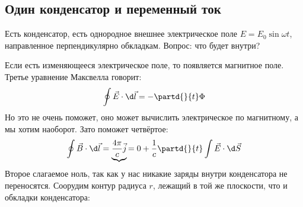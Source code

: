 \subsection{Один конденсатор и переменный ток}
	Есть конденсатор, есть однородное внешнее электрическое поле $E=E_0 \sin \omega t$, направленное перпендикулярно обкладкам.
	Вопрос: что будет внутри?

	Если есть изменяющееся электрическое поле, то появляется магнитное поле.
	Третье уравнение Максвелла говорит:
	\[ \oint \vec E \cdot \d \vec l = -\partd{}{t} \Phi \]
	Но это не очень поможет, оно может вычислить электрическое по магнитному, а мы хотим наоборот.
	Зато поможет четвёртое:
	\[ \oint \vec B \cdot \d \vec l = \underbrace{\frac{4\pi}{c} \vec j}{=0} + \frac1c \partd{}{t}\int \vec E \cdot \d \vec S\]
	Второе слагаемое ноль, так как у нас никакие заряды внутри конденсатора не переносятся.
	Соорудим контур радиуса $r$, лежащий в той же плоскости, что и обкладки конденсатора:

